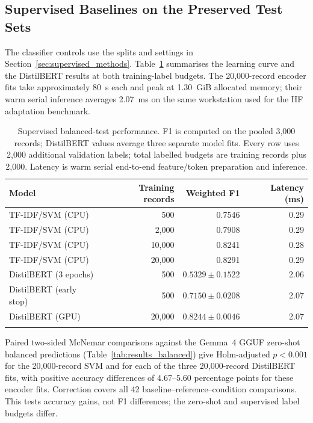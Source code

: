 \subsection{Supervised Baselines on the Preserved Test Sets}
\label{sec:supervised}

The classifier controls use the splits and settings in
Section~\ref{sec:supervised_methods}.
Table~\ref{tab:supervised} summarises the learning curve and the
DistilBERT results at both training-label budgets.
The 20,000-record encoder fits take approximately 80~s each and peak
at 1.30~GiB allocated memory; their warm serial inference averages
2.07~ms on the same workstation used for the HF adaptation benchmark.

\begin{table}[tb]
\centering
\caption{Supervised balanced-test performance. F1 is computed on the
pooled 3,000 records; DistilBERT values average three separate model fits.
Every row uses 2,000 additional validation labels; total labelled budgets
are training records plus 2,000. Latency is warm serial end-to-end feature/token preparation and inference.}
\label{tab:supervised}
\begin{tabular}{lrrr}
\toprule
Model & Training records & Weighted F1 & Latency (ms) \\
\midrule
TF-IDF/SVM (CPU) & 500 & 0.7546 & 0.29 \\
TF-IDF/SVM (CPU) & 2,000 & 0.7908 & 0.29 \\
TF-IDF/SVM (CPU) & 10,000 & 0.8241 & 0.28 \\
TF-IDF/SVM (CPU) & 20,000 & 0.8291 & 0.29 \\
DistilBERT (3 epochs) & 500 & $0.5329\pm0.1522$ & 2.06 \\
DistilBERT (early stop) & 500 & $0.7150\pm0.0208$ & 2.07 \\
DistilBERT (GPU) & 20,000 & $0.8244\pm0.0046$ & 2.07 \\
\botrule
\end{tabular}
\end{table}

Paired two-sided McNemar comparisons against the Gemma~4 GGUF zero-shot
balanced predictions (Table~\ref{tab:results_balanced}) give
Holm-adjusted $p<0.001$ for the 20,000-record
SVM and for each of the three 20,000-record DistilBERT fits,
with positive accuracy differences of 4.67--5.60 percentage points for
these encoder fits. Correction covers all 42
baseline--reference--condition comparisons. This tests accuracy gains,
not F1 differences; the zero-shot and supervised label budgets differ.

